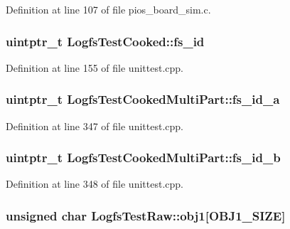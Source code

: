 Definition at line 107 of file pios\-\_\-board\-\_\-sim.\-c.

\hypertarget{group___unit_tests_gaa47f085754c3a15dd69bcfbde0d804d7}{
\subsubsection[{fs\-\_\-id}]{\setlength{\rightskip}{0pt plus 5cm}uintptr\-\_\-t Logfs\-Test\-Cooked\-::fs\-\_\-id\hspace{0.3cm}{\ttfamily [protected]}}}\label{group___unit_tests_gaa47f085754c3a15dd69bcfbde0d804d7}


Definition at line 155 of file unittest.\-cpp.

\hypertarget{group___unit_tests_gadeab2644468b89d495d396f0e55524e6}{
\subsubsection[{fs\-\_\-id\-\_\-a}]{\setlength{\rightskip}{0pt plus 5cm}uintptr\-\_\-t Logfs\-Test\-Cooked\-Multi\-Part\-::fs\-\_\-id\-\_\-a\hspace{0.3cm}{\ttfamily [protected]}}}\label{group___unit_tests_gadeab2644468b89d495d396f0e55524e6}


Definition at line 347 of file unittest.\-cpp.

\hypertarget{group___unit_tests_ga2398cf58e337f70603e12a997936f0c9}{
\subsubsection[{fs\-\_\-id\-\_\-b}]{\setlength{\rightskip}{0pt plus 5cm}uintptr\-\_\-t Logfs\-Test\-Cooked\-Multi\-Part\-::fs\-\_\-id\-\_\-b\hspace{0.3cm}{\ttfamily [protected]}}}\label{group___unit_tests_ga2398cf58e337f70603e12a997936f0c9}


Definition at line 348 of file unittest.\-cpp.

\hypertarget{group___unit_tests_ga9a310807ae65fdb582ace246798d9112}{
\subsubsection[{obj1}]{\setlength{\rightskip}{0pt plus 5cm}unsigned char Logfs\-Test\-Raw\-::obj1\mbox{[}O\-B\-J1\-\_\-\-S\-I\-Z\-E\mbox{]}\hspace{0.3cm}{\ttfamily [protected]}}}\label{group___unit_tests_ga9a310807ae65fdb582ace246798d9112}


